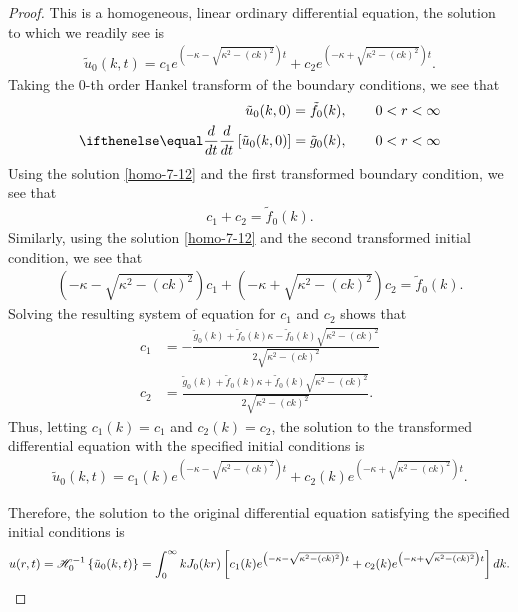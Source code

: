 \begin{proof}
  This is a homogeneous, linear ordinary differential equation, the solution to which
  we readily see is
  \begin{align}\label{homo-7-12}
    \tilde{u}_0(k, t) = c_1 e^{\left(-\kappa - \sqrt{\kappa^2 - (ck)^2}\right)t}  + c_2 e^{\left(-\kappa + \sqrt{\kappa^2 - (ck)^2}\right)t}.
  \end{align}
  Taking the 0-th order Hankel transform of the boundary conditions, we see that
  \begin{align*}
    \tilde{u}_0(k, 0) = \tilde{f}_0(k)&, \qquad 0 < r < \infty \\
    \der{t}{}\left[\tilde{u}_0(k, 0)\right] = \tilde{g}_0(k) &, \qquad 0 < r < \infty
  \end{align*}
  Using the solution \eqref{homo-7-12} and the first transformed boundary condition, we see that
  \begin{align*}
    c_1 + c_2 = \tilde{f}_0(k).
  \end{align*}
  Similarly, using the solution \eqref{homo-7-12} and the second transformed initial condition,
  we see that
  \begin{align*}
    \left(-\kappa - \sqrt{\kappa^2 - (ck)^2}\right)c_1 + \left(-\kappa + \sqrt{\kappa^2 - (ck)^2}\right)c_2 = \tilde{f}_0(k).
  \end{align*}
  Solving the resulting system of equation for $c_1$ and $c_2$ shows that
  \begin{align*}
    c_1 &= - \frac{\tilde{g}_0(k) + \tilde{f}_0(k) \kappa - \tilde{f}_0(k)\sqrt{\kappa^2 - (ck)^2}}{2\sqrt{\kappa^2 - (ck)^2}} \\
    c_2 &= \frac{\tilde{g}_0(k) + \tilde{f}_0(k) \kappa + \tilde{f}_0(k)\sqrt{\kappa^2 - (ck)^2}}{2\sqrt{\kappa^2 - (ck)^2}}.
  \end{align*}
  Thus, letting $c_1(k) = c_1$ and $c_2(k) = c_2$, the solution to the transformed differential equation with the
  specified initial conditions is
  \begin{align*}
    \tilde{u}_0(k, t) = c_1(k) e^{\left(-\kappa - \sqrt{\kappa^2 - (ck)^2}\right)t} + c_2(k)e^{\left(-\kappa + \sqrt{\kappa^2 - (ck)^2}\right)t}.
  \end{align*}

  Therefore, the solution to the original differential equation satisfying the specified initial conditions is
  \begin{align*}
    u(r, t) = \mathscr{H}^{-1}_{ {0} }\left\{ {\tilde{u}_0(k, t)} \right\} = \int_0^\infty k J_0(k r) \left[c_1(k) e^{\left(-\kappa - \sqrt{\kappa^2 - (ck)^2}\right)t} + c_2(k)e^{\left(-\kappa + \sqrt{\kappa^2 - (ck)^2}\right)t}\right] dk.
  \end{align*}
\end{proof}
\newpage
